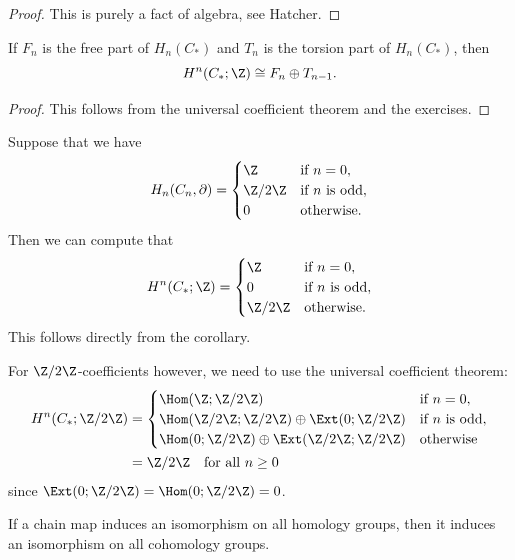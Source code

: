 \begin{proof}
  This is purely a fact of algebra, see Hatcher.
\end{proof}

\begin{corollary}
  If $F_n$ is the free part of $H_n(C_*)$ and
  $T_n$ is the torsion part of $H_n(C_*)$, then
  \[H^n(C_*; \Z) \cong F_n \oplus T_{n - 1}.\]
\end{corollary}

\begin{proof}
  This follows from the universal coefficient theorem
  and the exercises.
\end{proof}

\begin{example}
  Suppose that we have
  \[
    H_n(C_n, \partial) =
    \begin{cases}
      \Z & \text{if $n = 0$}, \\
      \Z / 2\Z & \text{if $n$ is odd}, \\
      0 & \text{otherwise}.
    \end{cases}
  \]
  Then we can compute that
  \[
    H^n(C_*; \Z) =
    \begin{cases}
      \Z & \text{if $n = 0$}, \\
      0 & \text{if $n$ is odd}, \\
      \Z / 2\Z & \text{otherwise}.
    \end{cases}
  \]
  This follows directly from the corollary.

  For $\Z / 2\Z$-coefficients however, we need to
  use the universal coefficient theorem:
  \begin{align*}
    H^n(C_*; \Z / 2\Z)
    &=
    \begin{cases}
      \Hom(\Z; \Z / 2\Z) & \text{if $n = 0$}, \\
      \Hom(\Z / 2\Z; \Z / 2\Z) \oplus \Ext(0; \Z / 2\Z) & \text{if $n$ is odd}, \\
      \Hom(0; \Z / 2\Z) \oplus \Ext(\Z / 2\Z; \Z / 2\Z) & \text{otherwise}
    \end{cases} \\
    &= \Z / 2\Z \quad \text{for all $n \ge 0$}
  \end{align*}
  since $\Ext(0; \Z / 2\Z) = \Hom(0; \Z / 2\Z) = 0$.
\end{example}

\begin{corollary}\label{cor:iso-cohom}
  If a chain map induces an isomorphism on
  all homology groups, then it induces an
  isomorphism on all cohomology groups.
\end{corollary}

